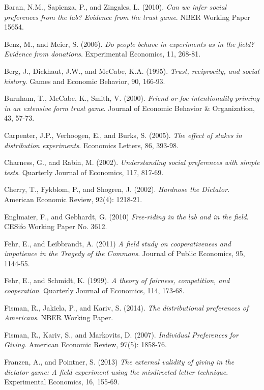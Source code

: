 \documentclass[12pt]{article}
\begin{document}
{\begin{thebibliography}{9}
Baran, N.M., Sapienza, P., and Zingales, L. (2010).
\textit{Can we infer social preferences from the lab? Evidence from the trust game}.
NBER Working Paper 15654.

Benz, M., and Meier, S. (2006).
\textit{Do people behave in experiments as in the field? Evidence from donations}.
Experimental Economics, 11, 268-81.

Berg, J., Dickhaut, J.W., and McCabe, K.A. (1995).
\textit{Trust, reciprocity, and social history}.
Games and Economic Behavior, 90, 166-93.

Burnham, T., McCabe, K., Smith, V. (2000).
\textit{Friend-or-foe intentionality priming in an extensive form trust game}.
Journal of Economic Behavior \& Organization, 43, 57-73.

Carpenter, J.P., Verhoogen, E., and Burks, S. (2005).
\textit{The effect of stakes in distribution experiments}.
Economics Letters, 86, 393-98.

Charness, G., and Rabin, M. (2002).
\textit{Understanding social preferences with simple tests}.
Quarterly Journal of Economics, 117, 817-69.

Cherry, T., Fykblom, P., and Shogren, J. (2002).
\textit{Hardnose the Dictator}.
American Economic Review, 92(4): 1218-21.

Englmaier, F., and Gebhardt, G. (2010)
\textit{Free-riding in the lab and in the field}.
CESifo Working Paper No. 3612.

Fehr, E., and Leibbrandt, A. (2011)
\textit{A field study on cooperativeness and impatience in the Tragedy of the Commons}.
Journal of Public Economics, 95, 1144-55.

Fehr, E., and Schmidt, K. (1999).
\textit{A theory of fairness, competition, and cooperation}.
Quarterly Journal of Economics, 114, 173-68.

Fisman, R., Jakiela, P., and Kariv, S. (2014).
\textit{The distributional preferences of Americans}.
NBER Working Paper.

Fisman, R., Kariv, S., and Markovits, D. (2007).
\textit{Individual Preferences for Giving}.
American Economic Review, 97(5): 1858-76.

Franzen, A., and Pointner, S. (2013)
\textit{The external validity of giving in the dictator game: A field experiment using the misdirected letter technique}.
Experimental Economics, 16, 155-69.


\end{thebibliography}}
\end{document}
